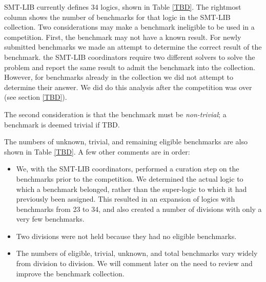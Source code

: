 \documentclass[twosize,11pt]{article}
\begin{document}
SMT-LIB currently defines 34 logics, shown in Table \ref{TBD}. The rightmost column shows the number of benchmarks for that logic in the SMT-LIB collection. Two considerations may make a benchmark ineligible to be used in a competition. First, the benchmark may not have a known result. For newly submitted benchmarks
we made an attempt to determine the correct result of the benchmark. the SMT-LIB coordinators require two 
different solvers to solve the problem and report the same result to admit the benchmark into the collection.
However, for benchmarks already in the collection we did not attempt to determine their answer. We did do this analysis after the competition was over (see section \ref{TBD}).

The second consideration is that the benchmark must be \textit{non-trivial}; a benchmark is deemed trivial if TBD.

The numbers of unknown, trivial, and remaining eligible benchmarks are also shown in Table \ref{TBD}. A few other comments are in order:
\begin{itemize}
\item We, with the SMT-LIB coordinators, performed a curation step on the benchmarks prior to the competition. We determined the actual logic to which a benchmark belonged, rather than the super-logic
to which it had previously been assigned. This resulted in an expansion of logics with benchmarks from 23 to 34, and also created a number of divisions with only a very few benchmarks.
\item Two divisions were not held because they had no eligible benchmarks.
\item The numbers of eligible, trivial, unknown, and total benchmarks vary widely from division to division. We will comment later on the need to review and improve the benchmark collection.
\end{itemize}
\end{document}
